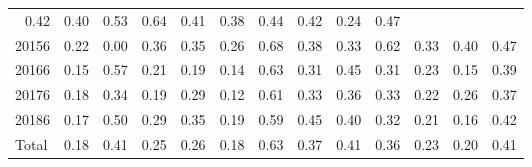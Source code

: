 \begin{table}[!h]
\begin{tabular}{lllllllllllll}
  \multicolumn{1}{r}{0.42} &
  \multicolumn{1}{r}{0.40} &
  \multicolumn{1}{r}{0.53} &
  \multicolumn{1}{r}{0.64} &
  \multicolumn{1}{r}{0.41} &
  \multicolumn{1}{r}{0.38} &
  \multicolumn{1}{r}{0.44} &
  \multicolumn{1}{r}{0.42} &
  \multicolumn{1}{r}{0.24} &
  \multicolumn{1}{r}{0.47} \\
\multicolumn{1}{l}{\hspace{1em}20156} &
  \multicolumn{1}{|r}{0.22} &
  \multicolumn{1}{r}{0.00} &
  \multicolumn{1}{r}{0.36} &
  \multicolumn{1}{r}{0.35} &
  \multicolumn{1}{r}{0.26} &
  \multicolumn{1}{r}{0.68} &
  \multicolumn{1}{r}{0.38} &
  \multicolumn{1}{r}{0.33} &
  \multicolumn{1}{r}{0.62} &
  \multicolumn{1}{r}{0.33} &
  \multicolumn{1}{r}{0.40} &
  \multicolumn{1}{r}{0.47} \\
\multicolumn{1}{l}{\hspace{1em}20166} &
  \multicolumn{1}{|r}{0.15} &
  \multicolumn{1}{r}{0.57} &
  \multicolumn{1}{r}{0.21} &
  \multicolumn{1}{r}{0.19} &
  \multicolumn{1}{r}{0.14} &
  \multicolumn{1}{r}{0.63} &
  \multicolumn{1}{r}{0.31} &
  \multicolumn{1}{r}{0.45} &
  \multicolumn{1}{r}{0.31} &
  \multicolumn{1}{r}{0.23} &
  \multicolumn{1}{r}{0.15} &
  \multicolumn{1}{r}{0.39} \\
\multicolumn{1}{l}{\hspace{1em}20176} &
  \multicolumn{1}{|r}{0.18} &
  \multicolumn{1}{r}{0.34} &
  \multicolumn{1}{r}{0.19} &
  \multicolumn{1}{r}{0.29} &
  \multicolumn{1}{r}{0.12} &
  \multicolumn{1}{r}{0.61} &
  \multicolumn{1}{r}{0.33} &
  \multicolumn{1}{r}{0.36} &
  \multicolumn{1}{r}{0.33} &
  \multicolumn{1}{r}{0.22} &
  \multicolumn{1}{r}{0.26} &
  \multicolumn{1}{r}{0.37} \\
\multicolumn{1}{l}{\hspace{1em}20186} &
  \multicolumn{1}{|r}{0.17} &
  \multicolumn{1}{r}{0.50} &
  \multicolumn{1}{r}{0.29} &
  \multicolumn{1}{r}{0.35} &
  \multicolumn{1}{r}{0.19} &
  \multicolumn{1}{r}{0.59} &
  \multicolumn{1}{r}{0.45} &
  \multicolumn{1}{r}{0.40} &
  \multicolumn{1}{r}{0.32} &
  \multicolumn{1}{r}{0.21} &
  \multicolumn{1}{r}{0.16} &
  \multicolumn{1}{r}{0.42} \\
\multicolumn{1}{l}{\hspace{1em}Total} &
  \multicolumn{1}{|r}{0.18} &
  \multicolumn{1}{r}{0.41} &
  \multicolumn{1}{r}{0.25} &
  \multicolumn{1}{r}{0.26} &
  \multicolumn{1}{r}{0.18} &
  \multicolumn{1}{r}{0.63} &
  \multicolumn{1}{r}{0.37} &
  \multicolumn{1}{r}{0.41} &
  \multicolumn{1}{r}{0.36} &
  \multicolumn{1}{r}{0.23} &
  \multicolumn{1}{r}{0.20} &
  \multicolumn{1}{r}{0.41} \\
\cline{1-13}
\end{tabular}
\end{table}
